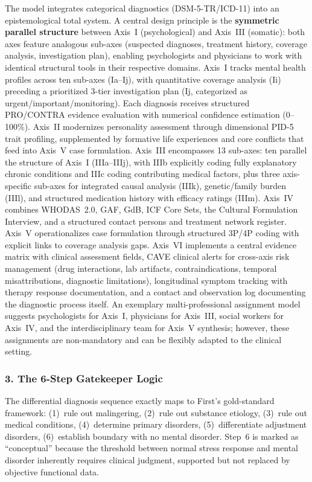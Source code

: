 \documentclass[11pt,a4paper]{article}
\begin{document}
The model integrates categorical diagnostics (DSM-5-TR/ICD-11) into an epistemological total system. A central design principle is the \textbf{symmetric parallel structure} between Axis~I (psychological) and Axis~III (somatic): both axes feature analogous sub-axes (suspected diagnoses, treatment history, coverage analysis, investigation plan), enabling psychologists and physicians to work with identical structural tools in their respective domains. Axis~I tracks mental health profiles across ten sub-axes (Ia--Ij), with quantitative coverage analysis (Ii) preceding a prioritized 3-tier investigation plan (Ij, categorized as urgent/important/monitoring). Each diagnosis receives structured PRO/CONTRA evidence evaluation with numerical confidence estimation (0--100\%). Axis~II modernizes personality assessment through dimensional PID-5 trait profiling, supplemented by formative life experiences and core conflicts that feed into Axis~V case formulation. Axis~III encompasses 13 sub-axes: ten parallel the structure of Axis~I (IIIa--IIIj), with IIIb explicitly coding fully explanatory chronic conditions and IIIc coding contributing medical factors, plus three axis-specific sub-axes for integrated causal analysis (IIIk), genetic/family burden (IIIl), and structured medication history with efficacy ratings (IIIm). Axis~IV combines WHODAS~2.0, GAF, GdB, ICF Core Sets, the Cultural Formulation Interview, and a structured contact persons and treatment network register. Axis~V operationalizes case formulation through structured 3P/4P coding with explicit links to coverage analysis gaps. Axis~VI implements a central evidence matrix with clinical assessment fields, CAVE clinical alerts for cross-axis risk management (drug interactions, lab artifacts, contraindications, temporal misattributions, diagnostic limitations), longitudinal symptom tracking with therapy response documentation, and a contact and observation log documenting the diagnostic process itself. An exemplary multi-professional assignment model suggests psychologists for Axis~I, physicians for Axis~III, social workers for Axis~IV, and the interdisciplinary team for Axis~V synthesis; however, these assignments are non-mandatory and can be flexibly adapted to the clinical setting.

\subsubsection*{3. The 6-Step Gatekeeper Logic}

The differential diagnosis sequence exactly maps to First's gold-standard framework: (1)~rule out malingering, (2)~rule out substance etiology, (3)~rule out medical conditions, (4)~determine primary disorders, (5)~differentiate adjustment disorders, (6)~establish boundary with no mental disorder. Step~6 is marked as ``conceptual'' because the threshold between normal stress response and mental disorder inherently requires clinical judgment, supported but not replaced by objective functional data.
\end{document}
